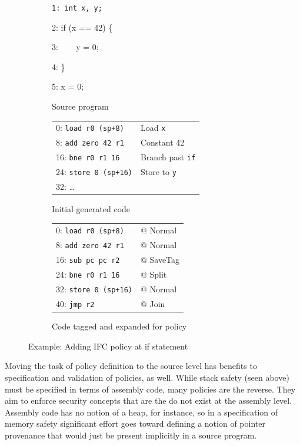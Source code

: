 \documentclass{report}
\begin{document}
\begin{figure}
  \begin{subfigure}[t]{0.22\textwidth}
    \vspace{0em}
    {\tt 1: int x, y;

    2: if (x == 42) \{

    3: ~~~ y = 0;

    4: \}

    5: x = 0;
    }

    \caption{Source program}
    \label{ex:if0}
  \end{subfigure}
  \begin{subfigure}[t]{0.42\textwidth}
    \vspace{0em}
    \begin{tabular}{l l}
      0: {\tt load r0 (sp+8)} & Load {\tt x} \\
      8: {\tt add zero 42 r1} & Constant 42 \\
      16: {\tt bne r0 r1 16} & Branch past {\tt if} \\
      24: {\tt store 0 (sp+16)} & Store to {\tt y} \\
      32: \dots & \\
    \end{tabular}
    \caption{Initial generated code}
    \label{ex:if1}
  \end{subfigure}
  \begin{subfigure}[t]{0.4\textwidth}
     \vspace{0em}
     \begin{tabular}{l l}
      0: {\tt load r0 (sp+8)} & @ {\sc Normal} \\
      8: {\tt add zero 42 r1} & @ {\sc Normal} \\
      16: {\tt sub pc pc r2} & @ {\sc SaveTag} \\
      24: {\tt bne r0 r1 16} & @ {\sc Split} \\
      32: {\tt store 0 (sp+16)} & @ {\sc Normal} \\
      40: {\tt jmp r2} & @ {\sc Join} \\
    \end{tabular}
    \caption{Code tagged and expanded for policy}
    \label{ex:if2}
  \end{subfigure}

  \caption{Example: Adding IFC policy at if statement}
  \label{ex:if}
\end{figure}

Moving the task of policy definition to the source level has benefits to specification and validation of
policies, as well. While stack safety (seen above) must be specified in terms of assembly code,
many policies are the reverse. They aim to enforce security concepts that are the do not exist at the
assembly level. Assembly code has no notion of a heap, for instance, so in a specification
of memory safety significant effort goes toward defining a notion of pointer provenance that
would just be present implicitly in a source program.
\end{document}
